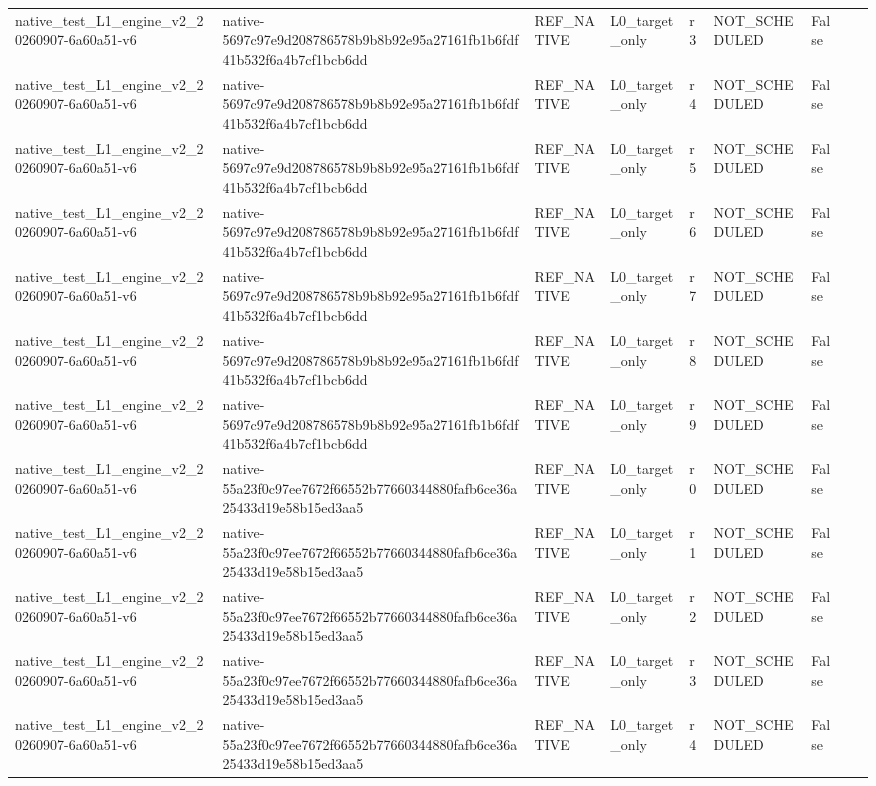 \begin{tabular}{lllllllll}
native\_test\_L1\_engine\_v2\_20260907-6a60a51-v6 & native-5697c97e9d208786578b9b8b92e95a27161fb1b6fdf41b532f6a4b7cf1bcb6dd & REF\_NATIVE & L0\_target\_only & r3 & NOT\_SCHEDULED & False &  &  \\
native\_test\_L1\_engine\_v2\_20260907-6a60a51-v6 & native-5697c97e9d208786578b9b8b92e95a27161fb1b6fdf41b532f6a4b7cf1bcb6dd & REF\_NATIVE & L0\_target\_only & r4 & NOT\_SCHEDULED & False &  &  \\
native\_test\_L1\_engine\_v2\_20260907-6a60a51-v6 & native-5697c97e9d208786578b9b8b92e95a27161fb1b6fdf41b532f6a4b7cf1bcb6dd & REF\_NATIVE & L0\_target\_only & r5 & NOT\_SCHEDULED & False &  &  \\
native\_test\_L1\_engine\_v2\_20260907-6a60a51-v6 & native-5697c97e9d208786578b9b8b92e95a27161fb1b6fdf41b532f6a4b7cf1bcb6dd & REF\_NATIVE & L0\_target\_only & r6 & NOT\_SCHEDULED & False &  &  \\
native\_test\_L1\_engine\_v2\_20260907-6a60a51-v6 & native-5697c97e9d208786578b9b8b92e95a27161fb1b6fdf41b532f6a4b7cf1bcb6dd & REF\_NATIVE & L0\_target\_only & r7 & NOT\_SCHEDULED & False &  &  \\
native\_test\_L1\_engine\_v2\_20260907-6a60a51-v6 & native-5697c97e9d208786578b9b8b92e95a27161fb1b6fdf41b532f6a4b7cf1bcb6dd & REF\_NATIVE & L0\_target\_only & r8 & NOT\_SCHEDULED & False &  &  \\
native\_test\_L1\_engine\_v2\_20260907-6a60a51-v6 & native-5697c97e9d208786578b9b8b92e95a27161fb1b6fdf41b532f6a4b7cf1bcb6dd & REF\_NATIVE & L0\_target\_only & r9 & NOT\_SCHEDULED & False &  &  \\
native\_test\_L1\_engine\_v2\_20260907-6a60a51-v6 & native-55a23f0c97ee7672f66552b77660344880fafb6ce36a25433d19e58b15ed3aa5 & REF\_NATIVE & L0\_target\_only & r0 & NOT\_SCHEDULED & False &  &  \\
native\_test\_L1\_engine\_v2\_20260907-6a60a51-v6 & native-55a23f0c97ee7672f66552b77660344880fafb6ce36a25433d19e58b15ed3aa5 & REF\_NATIVE & L0\_target\_only & r1 & NOT\_SCHEDULED & False &  &  \\
native\_test\_L1\_engine\_v2\_20260907-6a60a51-v6 & native-55a23f0c97ee7672f66552b77660344880fafb6ce36a25433d19e58b15ed3aa5 & REF\_NATIVE & L0\_target\_only & r2 & NOT\_SCHEDULED & False &  &  \\
native\_test\_L1\_engine\_v2\_20260907-6a60a51-v6 & native-55a23f0c97ee7672f66552b77660344880fafb6ce36a25433d19e58b15ed3aa5 & REF\_NATIVE & L0\_target\_only & r3 & NOT\_SCHEDULED & False &  &  \\
native\_test\_L1\_engine\_v2\_20260907-6a60a51-v6 & native-55a23f0c97ee7672f66552b77660344880fafb6ce36a25433d19e58b15ed3aa5 & REF\_NATIVE & L0\_target\_only & r4 & NOT\_SCHEDULED & False &  &  \\

\end{tabular}
